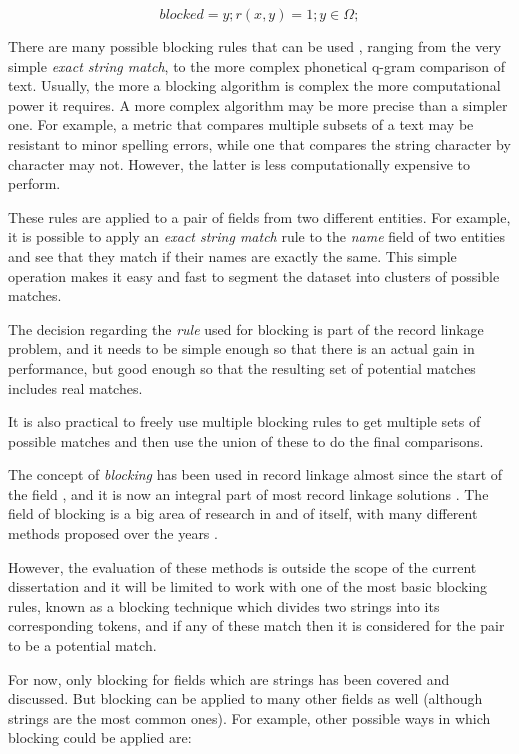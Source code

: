\documentclass[epsfig,a4paper,11pt,titlepage,twoside,openany]{book}
\begin{document}
$$
blocked = {y; r(x,y) = 1; y \in \Omega;}
$$

There are many possible blocking rules that can be used
\cite{christen12_survey_index_techn_scalab_recor_linkag_dedup}, ranging from the
very simple \textit{exact string match}, to the more complex phonetical q-gram
comparison of text. Usually, the more a blocking algorithm is complex the more computational power it requires. A more complex algorithm may be more precise than a simpler one. For example, a metric that compares multiple subsets of a text may be resistant to minor spelling errors, while one that compares the string character by character may not. However, the latter is less computationally expensive to perform.

These rules are applied to a pair of fields from two different entities. For
example, it is possible to apply an \textit{exact string match} rule to the \textit{name}
field of two entities and see that they match if their names are exactly the
same. This simple operation makes it easy and fast to segment the dataset into
clusters of possible matches.

The decision regarding the \textit{rule} used for blocking is part of the record
linkage problem, and it needs to be simple enough so that there is an actual gain in performance, but good enough so that the resulting set of potential
matches includes real matches. 

It is also practical to freely use multiple blocking
rules to get multiple sets of possible matches and then use the union of these
to do the final comparisons.

The concept of \textit{blocking} has been used in record linkage almost since
the start of the field \cite{fellegi69_theor_recor_linkag}, and it is now an integral part of most record linkage solutions \cite{winkler2006overview}. The
field of blocking is a big area of research in and of itself, with many
different methods proposed over the years
\cite{christen12_survey_index_techn_scalab_recor_linkag_dedup, Baxter2003ACO}.

However, the evaluation of these methods is outside the scope of the current
dissertation and it will be limited to work with one of the most basic blocking rules,
known as a blocking technique which divides two strings into its corresponding
tokens, and if any of these match then it is considered for the pair to be a potential match.


For now, only blocking for fields which are strings has been covered and discussed. But
blocking can be applied to many other fields as well (although strings are the
most common ones). For example, other possible ways in which blocking could be applied are: 
\end{document}
